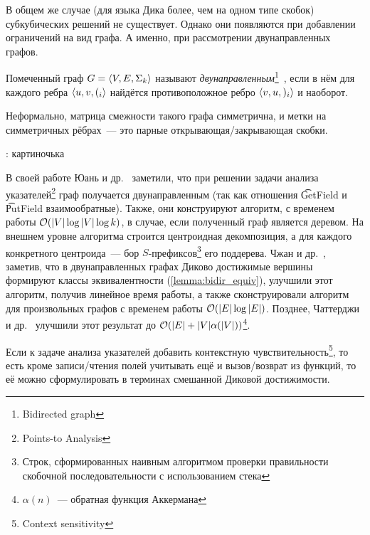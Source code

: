 В общем же случае (для языка Дика более, чем на одном типе скобок) субкубических решений не существует. Однако они появляются при добавлении ограничений на вид графа. А именно, при рассмотрении двунаправленных графов. 

\begin{definition}
  Помеченный граф $G = \langle V, E, \Sigma_k \rangle$ называют \textit{двунаправленным}\footnote{Bidirected graph}~\cite{Yuan09}, если в нём для каждого ребра $\langle u, v, (_i \rangle$ найдётся противоположное ребро $\langle v, u, )_i \rangle$ и наоборот.

  Неформально, матрица смежности такого графа симметрична, и метки на симметричных рёбрах~--- это парные открывающая/закрывающая скобки.
\end{definition}

\TODO: картиночька

В своей работе Юань и др.~\cite{Yuan09} заметили, что при решении задачи анализа указателей\footnote{Points-to Analysis} граф получается двунаправленным (так как отношения \t{GetField} и \t{PutField} взаимообратные). Также, они конструируют алгоритм, с временем работы $\mathcal{O}(|V| \log |V| \log k)$, в случае, если полученный граф является деревом. На внешнем уровне алгоритма строится центроидная декомпозиция, а для каждого конкретного центроида~--- бор $S$-префиксов\footnote{Строк, сформированных наивным алгоритмом проверки правильности скобочной последовательности с использованием стека} его поддерева. Чжан и др.~\cite{Zhang13}, заметив, что в двунаправленных графах Диково достижимые вершины формируют классы эквивалентности (\ref{lemma:bidir_equiv}), улучшили этот алгоритм, получив линейное время работы, а также сконструировали алгоритм для произвольных графов с временем работы $\mathcal{O}(|E| \log |E|)$. Позднее, Чаттерджи и др.~\cite{Chatterjee17} улучшили этот результат до $\mathcal{O}(|E| + |V| \alpha(|V|))$\footnote{$\alpha(n)$~--- обратная функция Аккермана}.

Если к задаче анализа указателей добавить контекстную чувствительность\footnote{Context sensitivity}, то есть кроме записи/чтения полей учитывать ещё и вызов/возврат из функций, то её можно сформулировать в терминах смешанной Диковой достижимости.

